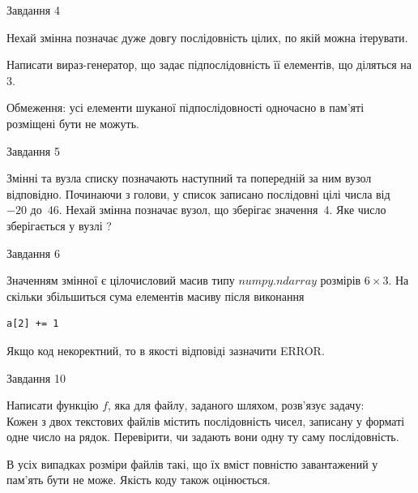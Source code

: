 \documentclass[12pt, ukrainian]{article}
\begin{document}
{               
{\begin{center}Завдання {4}\end{center}}
\vspace{-6mm}
Нехай змінна  позначає дуже довгу послідовність цілих, по якій можна ітерувати.

Написати вираз-генератор, що задає підпослідовність її елементів, що діляться на 3.

Обмеження: усі елементи шуканої підпослідовності одночасно в пам'яті розміщені бути не можуть.\par

\vspace{10mm}
               
{\begin{center}Завдання {5}\end{center}}
\vspace{-6mm}
Змінні  та  вузла списку позначають наступний та попередній за ним вузол відповідно. Починаючи з голови, у список записано послідовні цілі числа від~$-20$ до~$46$. Нехай змінна  позначає вузол, що зберігає значення~$4$.
Яке число зберігається у вузлі  ?\par

               
{\begin{center}Завдання {6}\end{center}}
\vspace{-6mm}
Значенням змінної  є цілочисловий масив типу $numpy.ndarray$ розмірів $6{\times}3$. На скільки збільшиться сума елементів масиву  після виконання
\begin{verbatim}
a[2] += 1
\end{verbatim}


Якщо код некоректний, то в якості відповіді зазначити ERROR.\par

               
{\begin{center}Завдання {10}\end{center}}
\vspace{-6mm}

Написати функцію $f$, яка для файлу, заданого шляхом, розв’язує задачу:\\ Кожен з двох текстових файлів містить послідовність чисел, записану у форматі одне число на рядок.  Перевірити, чи задають вони одну ту саму послідовність.

В усіх випадках розміри файлів такі, що їх вміст повністю завантажений у пам'ять бути не може. Якість коду також оцінюється.



}
\end{document}
